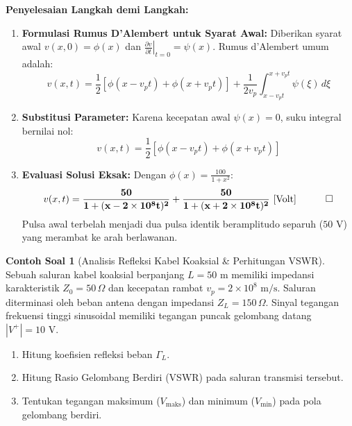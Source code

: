 \documentclass[11pt,a4paper]{article}
\theoremstyle{definition}
\newtheorem{example}{Contoh Soal}[section]
\begin{document}
\noindent\textbf{Penyelesaian Langkah demi Langkah:}
\begin{enumerate}[leftmargin=*]
    \item \textbf{Formulasi Rumus D'Alembert untuk Syarat Awal:}
    Diberikan syarat awal $v(x, 0) = \phi(x)$ dan $\left.\frac{\partial v}{\partial t}\right|_{t=0} = \psi(x)$. Rumus d'Alembert umum adalah:
    \begin{equation*}
        v(x, t) = \frac{1}{2}\left[ \phi(x - v_p t) + \phi(x + v_p t) \right] + \frac{1}{2 v_p} \int_{x - v_p t}^{x + v_p t} \psi(\xi) \, d\xi
    \end{equation*}
    
    \item \textbf{Substitusi Parameter:}
    Karena kecepatan awal $\psi(x) = 0$, suku integral bernilai nol:
    \begin{equation*}
        v(x, t) = \frac{1}{2} \left[ \phi(x - v_p t) + \phi(x + v_p t) \right]
    \end{equation*}
    
    \item \textbf{Evaluasi Solusi Eksak:}
    Dengan $\phi(x) = \frac{100}{1 + x^2}$:
    \begin{equation*}
        v(x, t) = \mathbf{\frac{50}{1 + (x - 2\times 10^8 t)^2} + \frac{50}{1 + (x + 2\times 10^8 t)^2}\text{ [Volt]}} \quad \qed
    \end{equation*}
    Pulsa awal terbelah menjadi dua pulsa identik beramplitudo separuh ($50\text{ V}$) yang merambat ke arah berlawanan.
\end{enumerate}

\begin{example}[Analisis Refleksi Kabel Koaksial \& Perhitungan VSWR]
Sebuah saluran kabel koaksial berpanjang $L = 50\text{ m}$ memiliki impedansi karakteristik $Z_0 = 50\,\Omega$ dan kecepatan rambat $v_p = 2 \times 10^8\text{ m/s}$. Saluran diterminasi oleh beban antena dengan impedansi $Z_L = 150\,\Omega$. Sinyal tegangan frekuensi tinggi sinusoidal memiliki tegangan puncak gelombang datang $|V^+| = 10\text{ V}$.
\begin{enumerate}[leftmargin=*]
    \item Hitung koefisien refleksi beban $\Gamma_L$.
    \item Hitung Rasio Gelombang Berdiri (VSWR) pada saluran transmisi tersebut.
    \item Tentukan tegangan maksimum ($V_{\text{maks}}$) dan minimum ($V_{\text{min}}$) pada pola gelombang berdiri.
\end{enumerate}
\end{example}
\end{document}
